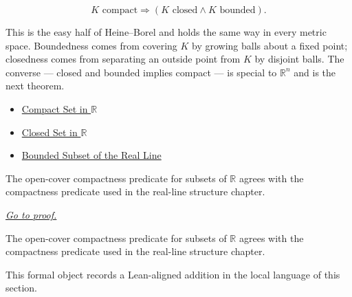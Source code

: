 \begin{remark*}
\[
K \text{ compact} \Longrightarrow (K \text{ closed} \land K \text{ bounded}).
\]
\end{remark*}
\begin{remark*}[Interpretation]
This is the easy half of Heine--Borel and holds the same way in every metric space. Boundedness comes from covering $K$ by growing balls about a fixed point; closedness comes from separating an outside point from $K$ by disjoint balls. The converse --- closed and bounded implies compact --- is special to $\mathbb{R}^{n}$ and is the next theorem.
\end{remark*}
\begin{dependencies}
\begin{itemize}
  \item \hyperref[def:compact-set]{Compact Set in $\mathbb{R}$}
  \item \hyperref[def:closed-set]{Closed Set in $\mathbb{R}$}
  \item \hyperref[def:bounded-subset-of-r]{Bounded Subset of the Real Line}
\end{itemize}
\end{dependencies}

\begin{theorem}
\label{thm:is-compact-set-iff-is-compact-r}
The open-cover compactness predicate for subsets of $\mathbb R$ agrees with the compactness predicate used in the real-line structure chapter.

\smallskip
\noindent
\hyperref[prf:is-compact-set-iff-is-compact-r]{\textit{Go to proof.}}
\end{theorem}

\begin{remark*}
The open-cover compactness predicate for subsets of $\mathbb R$ agrees with the compactness predicate used in the real-line structure chapter.
\end{remark*}

\begin{remark*}[Interpretation]
This formal object records a Lean-aligned addition in the local language of this section.
\end{remark*}

